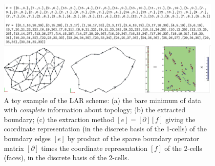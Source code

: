 \begin{figure}[ptb] %
 \centering
 \includegraphics[width=\linewidth]{images/minimum} 
 \caption{A toy example of the LAR scheme: (a) the bare minimum of data with \emph{complete} information about topology; (b) the extracted boundary; (c) the extraction method $[e] = [\partial][f]$ giving the coordinate representation (in the discrete basis of the 1-cells) of the boundary edges $[e]$ by product of the sparse boundary operator matrix $[\partial]$ times the coordinate representation $[f]$ of the 2-cells (faces), in the discrete basis of the 2-cells.}
 \label{fig:minimum}
\end{figure}

